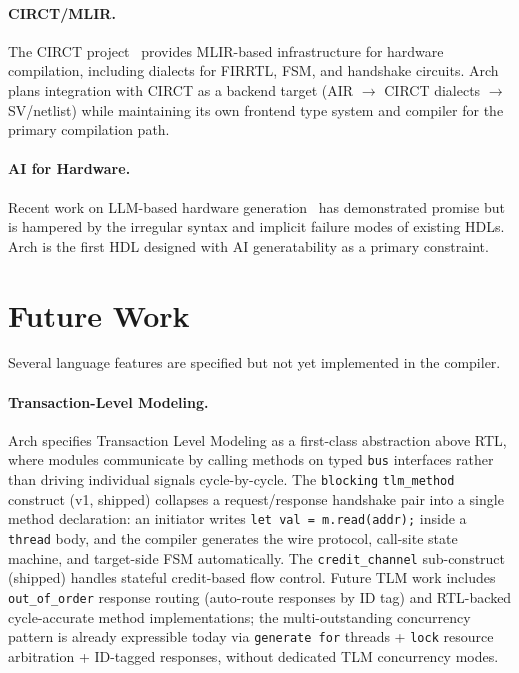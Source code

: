 \documentclass[manuscript]{acmart}
\begin{document}
\paragraph{CIRCT/MLIR.}
The CIRCT project~\cite{circt} provides MLIR-based infrastructure for hardware compilation, including dialects for FIRRTL, FSM, and handshake circuits. Arch plans integration with CIRCT as a backend target (AIR $\to$ CIRCT dialects $\to$ SV/netlist) while maintaining its own frontend type system and compiler for the primary compilation path.

\paragraph{AI for Hardware.}
Recent work on LLM-based hardware generation~\cite{thakur2023verigen,liu2023chipnemo,blocklove2023chip} has demonstrated promise but is hampered by the irregular syntax and implicit failure modes of existing HDLs. Arch is the first HDL designed with AI generatability as a primary constraint.

\section{Future Work}\label{sec:future}

Several language features are specified but not yet implemented in the compiler.

\paragraph{Transaction-Level Modeling.}
Arch specifies Transaction Level Modeling as a first-class abstraction above RTL, where modules communicate by calling methods on typed \texttt{bus} interfaces rather than driving individual signals cycle-by-cycle. The \texttt{blocking} \texttt{tlm\_method} construct (v1, shipped) collapses a request/response handshake pair into a single method declaration: an initiator writes \texttt{let val = m.read(addr);} inside a \texttt{thread} body, and the compiler generates the wire protocol, call-site state machine, and target-side FSM automatically. The \texttt{credit\_channel} sub-construct (shipped) handles stateful credit-based flow control. Future TLM work includes \texttt{out\_of\_order} response routing (auto-route responses by ID tag) and RTL-backed cycle-accurate method implementations; the multi-outstanding concurrency pattern is already expressible today via \texttt{generate for} threads + \texttt{lock} resource arbitration + ID-tagged responses, without dedicated TLM concurrency modes.
\end{document}
